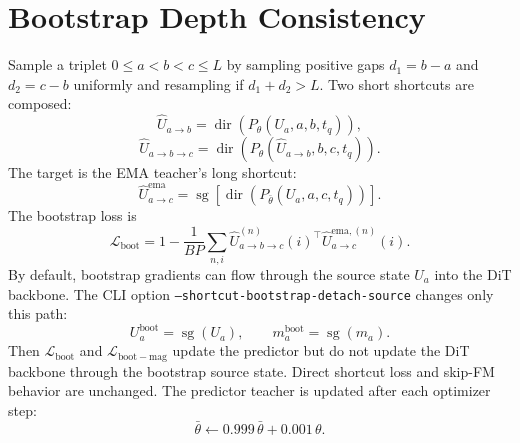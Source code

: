 \documentclass[11pt]{article}
\begin{document}
\section{Bootstrap Depth Consistency}
Sample a triplet $0\leq a<b<c\leq L$ by sampling positive gaps
$d_1=b-a$ and $d_2=c-b$ uniformly and resampling if $d_1+d_2>L$.
Two short shortcuts are composed:
\[
    \hat U_{a\rightarrow b}
    =
    \operatorname{dir}(P_\theta(U_a,a,b,t_q)),
\]
\[
    \hat U_{a\rightarrow b\rightarrow c}
    =
    \operatorname{dir}(P_\theta(\hat U_{a\rightarrow b},b,c,t_q)).
\]
The target is the EMA teacher's long shortcut:
\[
    \hat U_{a\rightarrow c}^{\mathrm{ema}}
    =
    \operatorname{sg}\!\left[
    \operatorname{dir}(P_{\bar\theta}(U_a,a,c,t_q))
    \right].
\]
The bootstrap loss is
\[
    \mathcal{L}_{\mathrm{boot}}
    =
    1-
    \frac{1}{BP}\sum_{n,i}
    \hat U_{a\rightarrow b\rightarrow c}^{(n)}(i)^\top
    \hat U_{a\rightarrow c}^{\mathrm{ema},(n)}(i).
\]
By default, bootstrap gradients can flow through the source state $U_a$ into
the DiT backbone. The CLI option
\texttt{--shortcut-bootstrap-detach-source} changes only this path:
\[
    U_a^{\mathrm{boot}}=\operatorname{sg}(U_a),\qquad
    m_a^{\mathrm{boot}}=\operatorname{sg}(m_a).
\]
Then $\mathcal{L}_{\mathrm{boot}}$ and $\mathcal{L}_{\mathrm{boot-mag}}$
update the predictor but do not update the DiT backbone through the bootstrap
source state. Direct shortcut loss and skip-FM behavior are unchanged.
The predictor teacher is updated after each optimizer step:
\[
    \bar\theta\leftarrow0.999\,\bar\theta+0.001\,\theta.
\]
\end{document}
